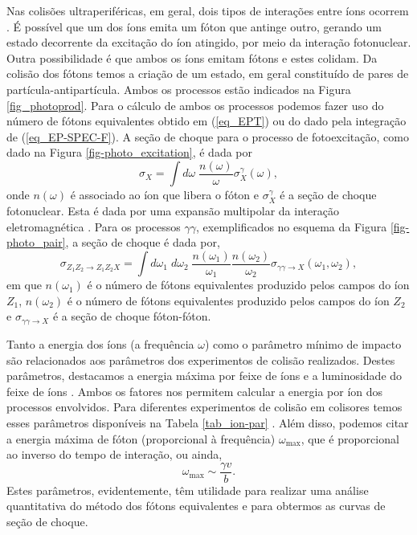 Nas colisões ultraperiféricas, em geral, dois tipos de interações entre íons
ocorrem \cite{bertulani2005}. É possível que um dos íons emita um
fóton que antinge outro, gerando um estado decorrente da excitação do íon
atingido, por meio da interação fotonuclear. Outra possibilidade é que ambos os
íons emitam fótons e estes colidam. Da colisão dos fótons temos a criação de um
estado, em geral constituído de pares de partícula-antipartícula. Ambos os
processos estão indicados na Figura \ref{fig_photoprod}.  Para o cálculo de
ambos os processos podemos fazer uso do número de fótons equivalentes obtido em
(\ref{eq_EPT}) ou do dado pela integração de (\ref{eq_EP-SPEC-F}). A seção de
choque para o processo de fotoexcitação, como dado na Figura
\ref{fig-photo_excitation}, é dada por
\begin{equation}
	\sigma _X = \int d\omega \; \frac{n(\omega)}{\omega} \sigma _X ^\gamma
	(\omega),
\end{equation}
onde $n(\omega)$ é associado ao íon que libera o fóton e $\sigma _X ^\gamma$ é
a seção de choque fotonuclear. Esta é dada por uma expansão multipolar da
interação eletromagnética \cite{BERTULANI1988299}.  Para os processos $\gamma
\gamma$, exemplificados no esquema da Figura \ref{fig-photo_pair}, a seção de
choque é dada por,
\begin{equation}
	\sigma _{Z_1 Z_2 \rightarrow Z_1Z_2 X} = \int d\omega _1 \; d\omega _2 \;
	\frac{n(\omega _1)}{\omega _1}
	\frac{n(\omega _2)}{\omega _2} \sigma _{\gamma \gamma \rightarrow X}
	(\omega _1,\omega _2),\label{eq_cross_section_gamma-gamma}
\end{equation}
em que $n(\omega _1)$ é o número de fótons equivalentes produzido pelos campos
do íon $Z_1$, $n(\omega _2)$ é o número de fótons equivalentes produzido pelos
campos do íon $Z_2$ e $\sigma _{\gamma \gamma \rightarrow X}$ é a seção de
choque fóton-fóton.

Tanto a energia dos íons (a frequência $\omega$) como o parâmetro mínimo de
impacto são relacionados aos parâmetros dos experimentos de colisão realizados.
Destes parâmetros, destacamos a energia máxima por feixe de íons e a
luminosidade do feixe de íons \cite{BAUR2002}. Ambos os fatores nos permitem
calcular a energia por íon dos processos envolvidos. Para diferentes
experimentos de colisão em colisores temos esses parâmetros disponíveis na
Tabela \ref{tab_ion-par} \cite{Workman2022ynf}. Além disso, podemos citar a
energia máxima de fóton (proporcional à frequência) $\omega _{\text{max}}$, que
é proporcional ao inverso do tempo de interação, ou ainda,
\begin{equation}
	\omega _{\text{max}} \sim \frac{\gamma v}{b}.
\end{equation}
Estes parâmetros, evidentemente, têm utilidade para realizar uma análise
quantitativa do método dos fótons equivalentes e para obtermos as curvas de
seção de choque.

